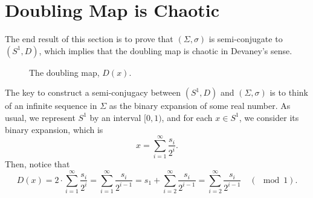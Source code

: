 \documentclass[10pt,twoside]{book}
\begin{document}
\section{Doubling Map is Chaotic}
The end result of this section is to prove that $(\Sigma, \sigma)$ is semi-conjugate to $(S^1, D)$, which implies that the doubling map is chaotic in Devaney's sense.
\begin{center}
\end{center}
\begin{figure}[ht]
  \centering
  \label{fig:doubling}
  \caption{The doubling map, $D(x)$.}
\end{figure}
The key to construct a semi-conjugacy between $(S^1,D)$ and $(\Sigma, \sigma)$ is to think of an infinite sequence in $\Sigma$ as the binary expansion of some real number.
As usual, we represent $S^1$ by an interval $[0,1)$, and for each $x \in S^1$, we consider its binary expansion, which is %
\begin{equation*}
  x = \sum\limits_{i = 1}^{\infty} \frac{s_i}{2^i}.
\end{equation*}
Then, notice that
\begin{equation*}
  D(x) = 2 \cdot \sum\limits_{i = 1}^{\infty} \frac{s_i}{2^i}
  = \sum\limits_{i = 1}^{\infty} \frac{s_i}{2^{i-1}}
  = s_1 + \sum\limits_{i = 2}^{\infty} \frac{s_i}{2^{i-1}}
  = \sum\limits_{i = 2}^{\infty} \frac{s_i}{2^{i-1}}
  \quad(\mod{1}).
\end{equation*}
\end{document}
